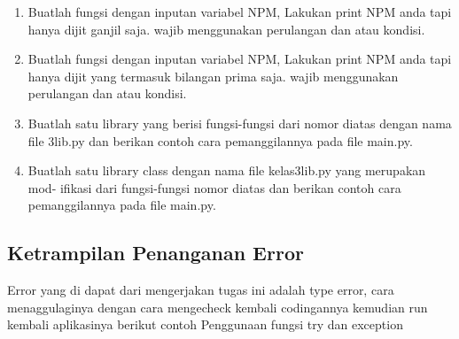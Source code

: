 \begin{enumerate}
    \item Buatlah fungsi dengan inputan variabel NPM, Lakukan print NPM anda tapi
    hanya dijit ganjil saja. wajib menggunakan perulangan dan atau kondisi.
    

    \item Buatlah fungsi dengan inputan variabel NPM, Lakukan print NPM anda tapi
    hanya dijit yang termasuk bilangan prima saja. wajib menggunakan perulangan
    dan atau kondisi.
    

    \item Buatlah satu library yang berisi fungsi-fungsi dari nomor diatas dengan nama
    file 3lib.py dan berikan contoh cara pemanggilannya pada file main.py.
    

    \item Buatlah satu library class dengan nama file kelas3lib.py yang merupakan mod-
    ifikasi dari fungsi-fungsi nomor diatas dan berikan contoh cara pemanggilannya
    pada file main.py.
    
    
\end{enumerate}
\subsection{Ketrampilan Penanganan Error}
Error yang di dapat dari mengerjakan tugas ini adalah type error, cara menaggulaginya dengan cara mengecheck kembali codingannya
kemudian run kembali aplikasinya
berikut contoh Penggunaan fungsi try dan exception

